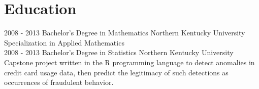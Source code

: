 \documentclass[]{./moak-resume}
\begin{document}
\section{Education}
\begin{entrylist}
  \entry
    {2008 - 2013}
    {Bachelor's Degree in Mathematics}
    {Northern Kentucky University}
    {Specialization in Applied Mathematics\\}
  \entry
    {2008 - 2013}
    {Bachelor's Degree in Statistics}
    {Northern Kentucky University}
    {Capstone project written in the R programming language to detect anomalies in credit card usage data, then predict the legitimacy of such detections as occurrences of fraudulent behavior.\\}
\end{entrylist}
\\
\end{document}
